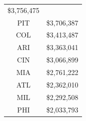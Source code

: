 \documentclass[]{book}
\theoremstyle{definition}
\theoremstyle{definition}
\theoremstyle{definition}
\theoremstyle{remark}
\begin{document}
\begin{longtable}[]{@{}cc@{}}
\begin{minipage}[t]{0.17\columnwidth}
\$3,756,475\strut
\end{minipage}\tabularnewline
\begin{minipage}[t]{0.12\columnwidth}\centering
PIT\strut
\end{minipage} & \begin{minipage}[t]{0.17\columnwidth}\centering
\$3,706,387\strut
\end{minipage}\tabularnewline
\begin{minipage}[t]{0.12\columnwidth}\centering
COL\strut
\end{minipage} & \begin{minipage}[t]{0.17\columnwidth}\centering
\$3,413,487\strut
\end{minipage}\tabularnewline
\begin{minipage}[t]{0.12\columnwidth}\centering
ARI\strut
\end{minipage} & \begin{minipage}[t]{0.17\columnwidth}\centering
\$3,363,041\strut
\end{minipage}\tabularnewline
\begin{minipage}[t]{0.12\columnwidth}\centering
CIN\strut
\end{minipage} & \begin{minipage}[t]{0.17\columnwidth}\centering
\$3,066,899\strut
\end{minipage}\tabularnewline
\begin{minipage}[t]{0.12\columnwidth}\centering
MIA\strut
\end{minipage} & \begin{minipage}[t]{0.17\columnwidth}\centering
\$2,761,222\strut
\end{minipage}\tabularnewline
\begin{minipage}[t]{0.12\columnwidth}\centering
ATL\strut
\end{minipage} & \begin{minipage}[t]{0.17\columnwidth}\centering
\$2,362,010\strut
\end{minipage}\tabularnewline
\begin{minipage}[t]{0.12\columnwidth}\centering
MIL\strut
\end{minipage} & \begin{minipage}[t]{0.17\columnwidth}\centering
\$2,292,508\strut
\end{minipage}\tabularnewline
\begin{minipage}[t]{0.12\columnwidth}\centering
PHI\strut
\end{minipage} & \begin{minipage}[t]{0.17\columnwidth}\centering
\$2,033,793\strut
\end{minipage}\tabularnewline
\bottomrule
\end{longtable}
\end{document}
